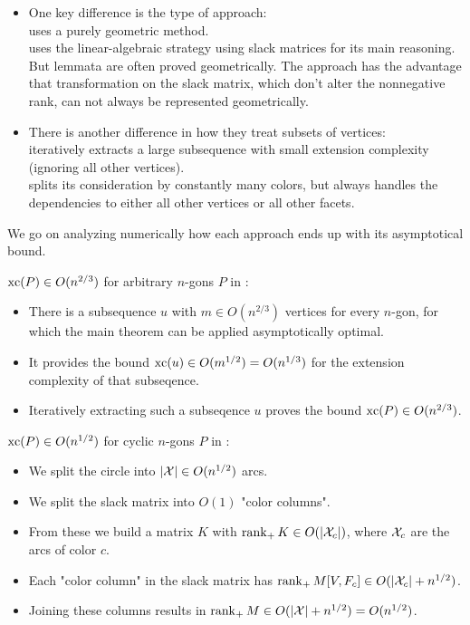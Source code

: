 \begin{itemize}
  \item One key difference is the type of approach:\\
  \cite{shitov2020sublinear} uses a purely geometric method.\\
  \cite{kwan2020extension} uses the linear-algebraic strategy using slack matrices for its main reasoning. But lemmata are often proved geometrically. The approach has the advantage that transformation on the slack matrix, which don't alter the nonnegative rank, can not always be represented geometrically.

  \item There is another difference in how they treat subsets of vertices:\\
  \cite{shitov2020sublinear} iteratively extracts a large subsequence with small extension complexity (ignoring all other vertices).\\
  \cite{kwan2020extension} splits its consideration by constantly many colors, but always handles the dependencies to either all other vertices or all other facets. 
\end{itemize}

We go on analyzing numerically how each approach ends up with its asymptotical bound.

$\operatorname{xc}(P) \in O(n^{2/3})$ for arbitrary $n$-gons $P$ in \cite{shitov2020sublinear}:
\begin{itemize}
  \item There is a subsequence $u$ with $m \in O(n^{2/3})$ vertices for every $n$-gon, for which the main theorem can be applied asymptotically optimal.
  \item It provides the bound $\operatorname{xc}(u) \in O(m^{1/2}) = O(n^{1/3})$ for the extension complexity of that subseqence. 
  \item Iteratively extracting such a subseqence $u$ proves the bound $\operatorname{xc}(P) \in O(n^{2/3})$.
\end{itemize}

$\operatorname{xc}(P) \in O(n^{1/2})$ for cyclic $n$-gons $P$ in \cite{kwan2020extension}:
\begin{itemize}
  \item We split the circle into $\lvert\mathcal{X}\rvert \in O(n^{1/2})$ arcs.
  \item We split the slack matrix into $O(1)$ "color columns".
  \item From these we build a matrix $K$ with $\operatorname{rank}_+ K \in O(\lvert\mathcal{X}_c\rvert)$, where $\mathcal{X}_c$ are the arcs of color $c$.
  \item Each "color column" in the slack matrix has $\operatorname{rank}_+ M[V,F_c] \in O(\lvert\mathcal{X}_c\rvert + n^{1/2})$.
  \item Joining these columns results in $\operatorname{rank}_+ M \in O(\lvert\mathcal{X}\rvert + n^{1/2}) = O(n^{1/2})$.
\end{itemize}

